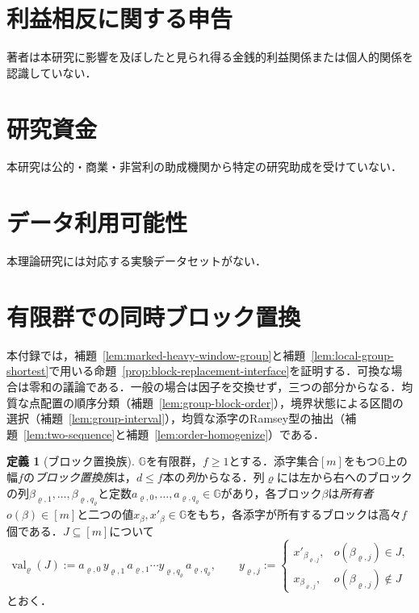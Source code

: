\documentclass[11pt,a4paper]{ltjsarticle}
\numberwithin{equation}{section}
\theoremstyle{plain}
\theoremstyle{definition}
\newtheorem{definition}[theorem]{定義}
\theoremstyle{remark}
\begin{document}
\section*{利益相反に関する申告}
著者は本研究に影響を及ぼしたと見られ得る金銭的利益関係または個人的関係を認識していない．
\section*{研究資金}
本研究は公的・商業・非営利の助成機関から特定の研究助成を受けていない．
\section*{データ利用可能性}
本理論研究には対応する実験データセットがない．

\appendix
\makeatletter
\gdef\thesection{\@Alph\c@section}
\let\jpapp@seccntformat\@seccntformat
\def\@seccntformat#1{\@ifundefined{jpapp@pre@#1}{}{\appendixname}\jpapp@seccntformat{#1}}
\makeatother
\section{有限群での同時ブロック置換}
\label{app:group-blocks}

本付録では，補題~\ref{lem:marked-heavy-window-group}と補題~\ref{lem:local-group-shortest}で用いる命題~\ref{prop:block-replacement-interface}を証明する．可換な場合は零和の議論である．一般の場合は因子を交換せず，三つの部分からなる．均質な点配置の順序分類（補題~\ref{lem:group-block-order}），境界状態による区間の選択（補題~\ref{lem:group-interval}），均質な添字のRamsey型の抽出（補題~\ref{lem:two-sequence}と補題~\ref{lem:order-homogenize}）である．

\begin{definition}[ブロック置換族]
\label{def:block-family}
${\mathbb G}$を有限群，$f\ge1$とする．添字集合$[m]$をもつ${\mathbb G}$上の幅$f$の\emph{ブロック置換族}は，$d\le f$本の\emph{列}からなる．列$\varrho$には左から右へのブロックの列$\beta_{\varrho,1},\ldots,\beta_{\varrho,q_\varrho}$と定数$a_{\varrho,0},\ldots,a_{\varrho,q_\varrho}\in {\mathbb G}$があり，各ブロック$\beta$は\emph{所有者}$o(\beta)\in[m]$と二つの値$x_\beta,x'_\beta\in {\mathbb G}$をもち，各添字が所有するブロックは高々$f$個である．$J\subseteq[m]$について
\[
 \operatorname{val}_\varrho(J):=a_{\varrho,0}\,y_{\varrho,1}\,a_{\varrho,1}\cdots y_{\varrho,q_\varrho}\,a_{\varrho,q_\varrho},
 \qquad
 y_{\varrho,j}:=
 \begin{cases}
 x'_{\beta_{\varrho,j}},& o(\beta_{\varrho,j})\in J,\\
 x_{\beta_{\varrho,j}},& o(\beta_{\varrho,j})\notin J
 \end{cases}
\]
とおく．
\end{definition}
\end{document}
